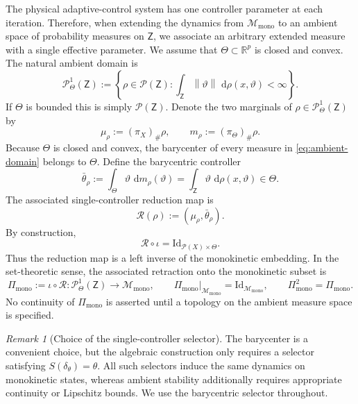 \documentclass[11pt]{article}
\theoremstyle{definition}
\theoremstyle{remark}
\newtheorem{remark}[theorem]{Remark}
\newcommand{\Prob}{\mathcal{P}}
\newcommand{\ProbThetaOne}{\mathcal{P}_{\Theta}^{1}}
\newcommand{\Id}{\mathrm{Id}}
\newcommand{\dd}{\,\mathrm{d}}
\newcommand{\norm}[1]{\left\lVert #1\right\rVert}
\newcommand{\R}{\mathbb{R}}
\newcommand{\ThetaSet}{\Theta}
\newcommand{\Z}{\mathsf{Z}}
\newcommand{\Mmono}{\mathscr{M}_{\mathrm{mono}}}
\begin{document}
The physical adaptive-control system has one controller parameter at each
iteration.  Therefore, when extending the dynamics from \(\Mmono\) to an
ambient space of probability measures on \(\Z\), we associate an arbitrary
extended measure with a single effective parameter.  We assume that \(\ThetaSet\subset\R^p\) is closed and convex.  The natural
ambient domain is
\begin{equation}
  \ProbThetaOne(\Z)
  :=\left\{\rho\in\Prob(\Z):
       \int_{\Z}\norm{\vartheta}\,\dd\rho(x,\vartheta)<\infty\right\}.
  \label{eq:ambient-domain}
\end{equation}
If \(\ThetaSet\) is bounded this is simply \(\Prob(\Z)\).  Denote the two marginals
of \(\rho\in\ProbThetaOne(\Z)\) by
\begin{equation}
  \mu_\rho:=(\pi_X)_\#\rho,
  \qquad
  m_\rho:=(\pi_\Theta)_\#\rho.
  \label{eq:extended-marginals}
\end{equation}
Because \(\ThetaSet\) is closed and convex, the barycenter of every measure in
\eqref{eq:ambient-domain} belongs to \(\ThetaSet\).  Define the barycentric controller
\begin{equation}
  \bar\theta_\rho
  :=\int_{\ThetaSet}\vartheta\,\dd m_\rho(\vartheta)
  =\int_{\Z}\vartheta\,\dd\rho(x,\vartheta)
  \in\ThetaSet.
  \label{eq:barycentric-controller}
\end{equation}
The associated single-controller reduction map is
\begin{equation}
  \mathcal R(\rho):=(\mu_\rho,\bar\theta_\rho).
  \label{eq:single-controller-retraction}
\end{equation}
By construction,
\begin{equation}
  \boxed{\mathcal R\circ\iota=\Id_{\Prob(X)\times\ThetaSet}.}
  \label{eq:retraction-identity}
\end{equation}
Thus the reduction map is a left inverse of the monokinetic embedding.  In the
set-theoretic sense, the associated retraction onto the monokinetic subset is
\begin{equation}
  \Pi_{\mathrm{mono}}:=\iota\circ\mathcal R:
  \ProbThetaOne(\Z)\longrightarrow\Mmono,
  \qquad
  \Pi_{\mathrm{mono}}|_{\Mmono}=\Id_{\Mmono},
  \qquad \Pi_{\mathrm{mono}}^2=\Pi_{\mathrm{mono}}.
  \label{eq:monokinetic-retraction}
\end{equation}
No continuity of \(\Pi_{\mathrm{mono}}\) is asserted until a topology on the
ambient measure space is specified.

\begin{remark}[Choice of the single-controller selector]
The barycenter is a convenient choice, but the algebraic
construction only requires a selector satisfying
$S(\delta_\theta)=\theta$.
All such selectors induce the same dynamics on monokinetic
states, whereas ambient stability additionally requires
appropriate continuity or Lipschitz bounds.
We use the barycentric selector throughout.
\end{remark}
\end{document}

